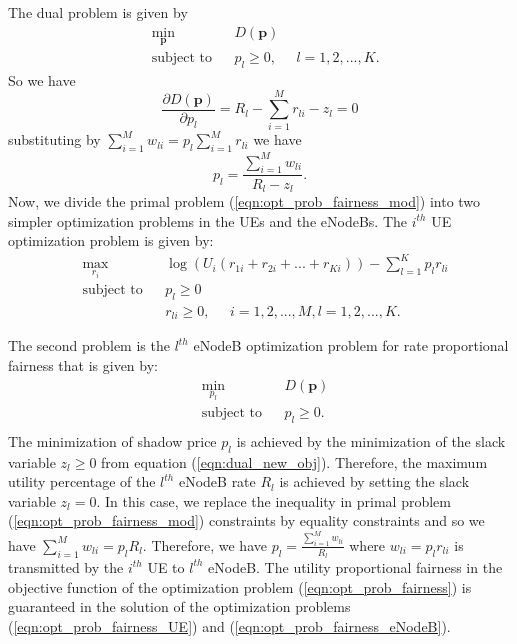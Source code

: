 \documentclass[journal]{IEEEtran} 		\usepackage{amsmath,amssymb}
\begin{document}
The dual problem is given by
\begin{equation}\label{eqn:dual_problem}
\begin{aligned}
& \underset{{\textbf{p}}}{\text{min}}
& & D(\textbf{p}) \\
& \text{subject to}
& & p_l \geq 0, \;\;\;\;\;l = 1,2, ...,K.
\end{aligned}
\end{equation}
So we have
\begin{equation}\label{eqn:dual_max}
\frac{\partial D(\textbf{p})}{\partial p_l} =  R_l-\sum_{i=1}^{M}r_{li} -z_l = 0
\end{equation}
substituting by $\sum_{i=1}^{M}w_{li} = p_l \sum_{i=1}^{M}r_{li}$ we have
\begin{equation}\label{eqn:dual_new_obj}
p_l = \frac{\sum_{i=1}^{M}w_{li}}{R_l-z_l}.
\end{equation}
Now, we divide the primal problem (\ref{eqn:opt_prob_fairness_mod}) into two simpler optimization problems in the UEs and the eNodeBs. The $i^{th}$ UE optimization problem is given by:
\begin{equation}\label{eqn:opt_prob_fairness_UE}
\begin{aligned}
& \underset{{r_i}}{\text{max}}
& & \log(U_i(r_{1i} + r_{2i} + ... + r_{Ki}))-\sum_{l=1}^{K}p_lr_{li} \\
& \text{subject to}
& & p_l \geq 0\\
& & &  r_{li} \geq 0, \;\;\;\;\; i = 1,2, ...,M, l = 1,2, ...,K.
\end{aligned}
\end{equation}

The second problem is the $l^{th}$ eNodeB optimization problem for rate proportional fairness that is given by:
\begin{equation}\label{eqn:opt_prob_fairness_eNodeB}
\begin{aligned}
& \underset{p_l}{\text{min}}
& & D(\textbf{p}) \\
& \text{subject to}
& & p_l \geq 0.\\
\end{aligned}
\end{equation}
The minimization of shadow price $p_l$ is achieved by the minimization of the slack variable $z_l \geq 0$ from equation (\ref{eqn:dual_new_obj}). Therefore, the maximum utility percentage of the $l^{th}$ eNodeB rate $R_l$ is achieved by setting the slack variable $z_l = 0$. In this case, we replace the inequality in primal problem (\ref{eqn:opt_prob_fairness_mod}) constraints by  equality constraints and so we have $\sum_{i=1}^{M}w_{li} = p_l R_l$. Therefore, we have $p_l = \frac{\sum_{i=1}^{M}w_{li}}{R_l}$ where $w_{li} = p_l r_{li}$ is transmitted by the $i^{th}$ UE to $l^{th}$ eNodeB. The utility proportional fairness in the objective function of the optimization problem (\ref{eqn:opt_prob_fairness}) is guaranteed in the solution of the optimization problems (\ref{eqn:opt_prob_fairness_UE}) and (\ref{eqn:opt_prob_fairness_eNodeB}).
\end{document}
